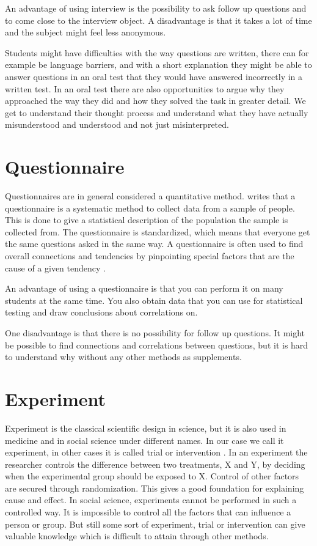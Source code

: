 \bigskip\noindent
An advantage of using interview is the possibility to ask follow up questions and to come close to the interview object.
A disadvantage is that it takes a lot of time and the subject might feel less anonymous.

\bigskip\noindent
Students might have difficulties with the way questions are written, there can for example be language barriers, and with a short explanation they might be able to answer questions in an oral test that they would have answered incorrectly in a written test. In an oral test there are also opportunities to argue why they approached the way they did and how they solved the task in greater detail. We get to understand their thought process and understand what they have actually misunderstood and understood and not just misinterpreted.  

\section{Questionnaire}
Questionnaires are in general considered a quantitative method. \cite{ringdal2001enhet} writes that a questionnaire is a systematic method to collect data from a sample of people. This is done to give a statistical description of the population the sample is collected from. The questionnaire is standardized, which means that everyone get the same questions asked in the same way. A questionnaire is often used to find overall connections and tendencies by pinpointing special factors that are the cause of a given tendency \cite{tjora2012kvalitative}. 

\bigskip\noindent
An advantage of using a questionnaire is that you can perform it on many students at the same time. You also obtain data that you can use for statistical testing and draw conclusions about correlations on. 

\bigskip\noindent
One disadvantage is that there is no possibility for follow up questions. It might be possible to find connections and correlations between questions, but it is hard to understand why without any other methods as supplements.

\section{Experiment}
Experiment is the classical scientific design in science, but it is also used in medicine and in social science under different names. In our case we call it experiment, in other cases it is called trial or intervention \cite{ringdal2001enhet}. In an experiment the researcher controls the difference between two treatments, X and Y, by deciding when the experimental group should be exposed to X. Control of other factors are secured through randomization. This gives a good foundation for explaining cause and effect. In social science, experiments cannot be performed in such a controlled way. It is impossible to control all the factors that can influence a person or group. But still some sort of experiment, trial or intervention can give valuable knowledge which is difficult to attain through other methods.

